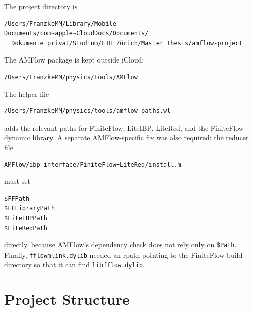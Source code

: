\documentclass[11pt]{article}
\newcommand{\WL}[1]{\texttt{#1}}
\begin{document}
The project directory is
\begin{verbatim}
/Users/FranzkeMM/Library/Mobile Documents/com~apple~CloudDocs/Documents/
  Dokumente privat/Studium/ETH Zürich/Master Thesis/amflow-project
\end{verbatim}
The AMFlow package is kept outside iCloud:
\begin{verbatim}
/Users/FranzkeMM/physics/tools/AMFlow
\end{verbatim}
The helper file
\begin{verbatim}
/Users/FranzkeMM/physics/tools/amflow-paths.wl
\end{verbatim}
adds the relevant paths for FiniteFlow, LiteIBP, LiteRed, and the FiniteFlow
dynamic library. A separate AMFlow-specific fix was also required: the reducer
file
\begin{verbatim}
AMFlow/ibp_interface/FiniteFlow+LiteRed/install.m
\end{verbatim}
must set
\begin{verbatim}
$FFPath
$FFLibraryPath
$LiteIBPPath
$LiteRedPath
\end{verbatim}
directly, because AMFlow's dependency check does not rely only on
\(\$\)\WL{Path}. Finally, \WL{fflowmlink.dylib} needed an rpath pointing to the
FiniteFlow build directory so that it can find \WL{libfflow.dylib}.

\section{Project Structure}
\end{document}
